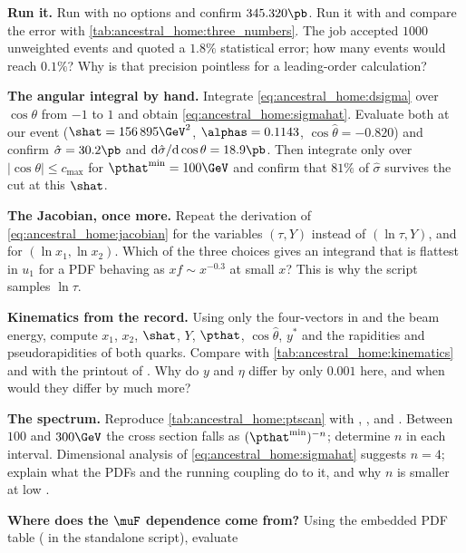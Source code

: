 \begin{exercises}
\item \textbf{Run it.} Run  with no
  options and confirm $345.320\pb$. Run it with  and
  compare the error with \cref{tab:ancestral_home:three_numbers}. The
  \CMSSW job accepted $1000$ unweighted events and quoted a $1.8\%$
  statistical error; how many events would reach $0.1\%$? Why is that
  precision pointless for a leading-order calculation?
\item \textbf{The angular integral by hand.} Integrate
  \cref{eq:ancestral_home:dsigma} over $\cos\theta$ from $-1$ to $1$ and
  obtain \cref{eq:ancestral_home:sigmahat}. Evaluate both at our event
  ($\shat=156\,895\GeV^2$, $\alphas=0.1143$, $\cos\hat\theta=-0.820$) and
  confirm $\hat\sigma=30.2\pb$ and
  $\mathrm{d}\hat\sigma/\mathrm{d}\cos\theta=18.9\pb$. Then integrate only
  over $|\cos\theta|\le c_{\max}$ for $\pthat^{\min}=100\GeV$ and confirm
  that $81\%$ of $\hat\sigma$ survives the cut at this $\shat$.
\item \textbf{The Jacobian, once more.} Repeat the derivation of
  \cref{eq:ancestral_home:jacobian} for the variables $(\tau,Y)$ instead of
  $(\ln\tau,Y)$, and for $(\ln x_1,\ln x_2)$. Which of the three choices
  gives an integrand that is flattest in $u_1$ for a PDF behaving as
  $xf\sim x^{-0.3}$ at small $x$? This is why the script samples $\ln\tau$.
\item \textbf{Kinematics from the record.} Using only the four-vectors in
   and the beam energy, compute $x_1$, $x_2$, $\shat$, $Y$,
  $\pthat$, $\cos\hat\theta$, $y^{*}$ and the rapidities and pseudorapidities
  of both quarks. Compare with \cref{tab:ancestral_home:kinematics} and with
  the printout of . Why do $y$ and $\eta$ differ by
  only $0.001$ here, and when would they differ by much more?
\item \textbf{The \pt spectrum.} Reproduce \cref{tab:ancestral_home:ptscan}
  with , ,  and . Between
  $100$ and $300\GeV$ the cross section falls as $(\pthat^{\min})^{-n}$;
  determine $n$ in each interval. Dimensional analysis of
  \cref{eq:ancestral_home:sigmahat} suggests $n=4$; explain what the PDFs
  and the running coupling do to it, and why $n$ is smaller at low \pt.
\item \textbf{Where does the $\muF$ dependence come from?} Using the
  embedded PDF table ( in the standalone script), evaluate

\end{exercises}
